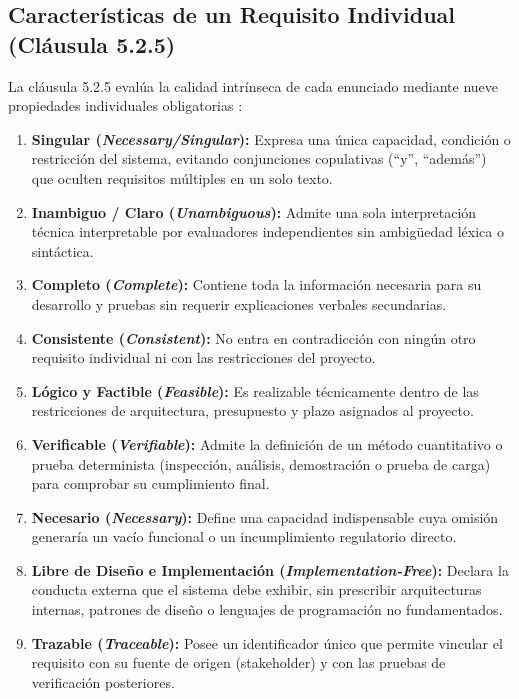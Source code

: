 \documentclass[conference]{IEEEtran}
\begin{document}
	\subsection{Características de un Requisito Individual (Cláusula 5.2.5)}
	La cláusula 5.2.5 evalúa la calidad intrínseca de cada enunciado mediante nueve propiedades individuales obligatorias \cite{ieee29148}:
	\begin{enumerate}
		\item \textbf{Singular (\emph{Necessary/Singular}):} Expresa una única capacidad, condición o restricción del sistema, evitando conjunciones copulativas (``y'', ``además'') que oculten requisitos múltiples en un solo texto.
		\item \textbf{Inambiguo / Claro (\emph{Unambiguous}):} Admite una sola interpretación técnica interpretable por evaluadores independientes sin ambigüedad léxica o sintáctica.
		\item \textbf{Completo (\emph{Complete}):} Contiene toda la información necesaria para su desarrollo y pruebas sin requerir explicaciones verbales secundarias.
		\item \textbf{Consistente (\emph{Consistent}):} No entra en contradicción con ningún otro requisito individual ni con las restricciones del proyecto.
		\item \textbf{Lógico y Factible (\emph{Feasible}):} Es realizable técnicamente dentro de las restricciones de arquitectura, presupuesto y plazo asignados al proyecto.
		\item \textbf{Verificable (\emph{Verifiable}):} Admite la definición de un método cuantitativo o prueba determinista (inspección, análisis, demostración o prueba de carga) para comprobar su cumplimiento final.
		\item \textbf{Necesario (\emph{Necessary}):} Define una capacidad indispensable cuya omisión generaría un vacío funcional o un incumplimiento regulatorio directo.
		\item \textbf{Libre de Diseño e Implementación (\emph{Implementation-Free}):} Declara la conducta externa que el sistema debe exhibir, sin prescribir arquitecturas internas, patrones de diseño o lenguajes de programación no fundamentados.
		\item \textbf{Trazable (\emph{Traceable}):} Posee un identificador único que permite vincular el requisito con su fuente de origen (stakeholder) y con las pruebas de verificación posteriores.
	\end{enumerate}
	
\end{document}
